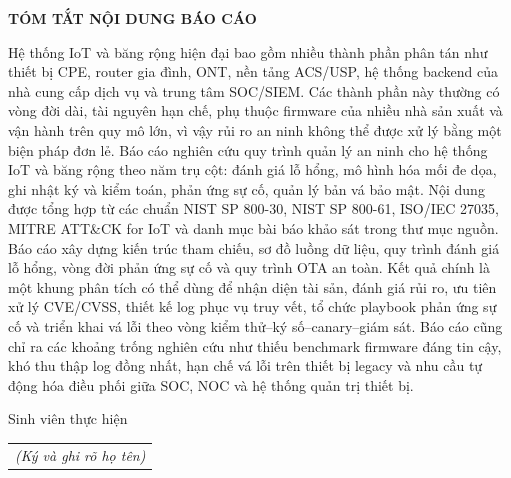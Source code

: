 \documentclass[../DoAn.tex]{subfiles}
\begin{document}
\begin{center}
    \Large{\textbf{TÓM TẮT NỘI DUNG BÁO CÁO}}\\
\end{center}
\vspace{1cm}
Hệ thống IoT và băng rộng hiện đại bao gồm nhiều thành phần phân tán như thiết bị CPE, router gia đình, ONT, nền tảng ACS/USP, hệ thống backend của nhà cung cấp dịch vụ và trung tâm SOC/SIEM. Các thành phần này thường có vòng đời dài, tài nguyên hạn chế, phụ thuộc firmware của nhiều nhà sản xuất và vận hành trên quy mô lớn, vì vậy rủi ro an ninh không thể được xử lý bằng một biện pháp đơn lẻ. Báo cáo nghiên cứu quy trình quản lý an ninh cho hệ thống IoT và băng rộng theo năm trụ cột: đánh giá lỗ hổng, mô hình hóa mối đe dọa, ghi nhật ký và kiểm toán, phản ứng sự cố, quản lý bản vá bảo mật. Nội dung được tổng hợp từ các chuẩn NIST SP 800-30, NIST SP 800-61, ISO/IEC 27035, MITRE ATT\&CK for IoT và danh mục bài báo khảo sát trong thư mục nguồn. Báo cáo xây dựng kiến trúc tham chiếu, sơ đồ luồng dữ liệu, quy trình đánh giá lỗ hổng, vòng đời phản ứng sự cố và quy trình OTA an toàn. Kết quả chính là một khung phân tích có thể dùng để nhận diện tài sản, đánh giá rủi ro, ưu tiên xử lý CVE/CVSS, thiết kế log phục vụ truy vết, tổ chức playbook phản ứng sự cố và triển khai vá lỗi theo vòng kiểm thử--ký số--canary--giám sát. Báo cáo cũng chỉ ra các khoảng trống nghiên cứu như thiếu benchmark firmware đáng tin cậy, khó thu thập log đồng nhất, hạn chế vá lỗi trên thiết bị legacy và nhu cầu tự động hóa điều phối giữa SOC, NOC và hệ thống quản trị thiết bị.
\begin{flushright}
Sinh viên thực hiện\\
\begin{tabular}{@{}c@{}}
\textit{(Ký và ghi rõ họ tên)}
\end{tabular}
\end{flushright}
\end{document}
